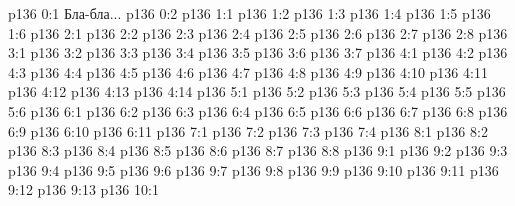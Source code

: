 \author{Промежуточные создания}
\vs p136 0:1  Бла-бла...
\vs p136 0:2 
\vs p136 1:1 
\vs p136 1:2 
\vs p136 1:3 
\vs p136 1:4 \pc 
\vs p136 1:5 
\vs p136 1:6 
\vs p136 2:1 
\vs p136 2:2 \pc 
\vs p136 2:3 
\vs p136 2:4 \pc 
\vs p136 2:5 
\vs p136 2:6 \pc 
\vs p136 2:7 
\vs p136 2:8 \pc 
{}
\vs p136 3:1 
\vs p136 3:2 
\vs p136 3:3 
\vs p136 3:4 \pc 
\vs p136 3:5 
\vs p136 3:6 
\vs p136 3:7 \pc 
{}
\vs p136 4:1 
\vs p136 4:2 
\vs p136 4:3 \pc 
\vs p136 4:4 \pc 
\vs p136 4:5 
\vs p136 4:6 
\vs p136 4:7 
\vs p136 4:8 
\vs p136 4:9 
\vs p136 4:10 \pc 
\vs p136 4:11 \pc 
\vs p136 4:12 
\vs p136 4:13 
\vs p136 4:14 \pc 
{}
\vs p136 5:1 
\vs p136 5:2 
\vs p136 5:3 \pc 
\vs p136 5:4 
\vs p136 5:5 \pc 
\vs p136 5:6 
\vs p136 6:1 
\vs p136 6:2 
\vs p136 6:3 
\vs p136 6:4 
\vs p136 6:5 
\vs p136 6:6 
\vs p136 6:7 
\vs p136 6:8 
\vs p136 6:9 \pc 
\vs p136 6:10 
\vs p136 6:11 
\vs p136 7:1 
\vs p136 7:2 
\vs p136 7:3 \pc 
\vs p136 7:4 
\vs p136 8:1 
\vs p136 8:2 
\vs p136 8:3 \pc 
\vs p136 8:4 \pc 
\vs p136 8:5 
\vs p136 8:6 
\vs p136 8:7 \pc 
\vs p136 8:8 \pc 
{}
\vs p136 9:1 
\vs p136 9:2 
\vs p136 9:3 
\vs p136 9:4 
\vs p136 9:5 
\vs p136 9:6 
\vs p136 9:7 
\vs p136 9:8 
\vs p136 9:9 \pc 
\vs p136 9:10 \pc 
\vs p136 9:11 
\vs p136 9:12 
\vs p136 9:13 
\vs p136 10:1 
\quizlink
